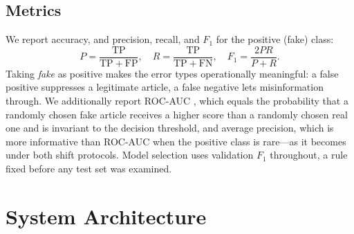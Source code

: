 \documentclass[conference]{IEEEtran}
\newcommand{\Fone}{$F_1$}
\begin{document}
\subsection{Metrics}
We report accuracy, and precision, recall, and \Fone{} for the positive
(fake) class:
\begin{equation}
  P=\frac{\mathrm{TP}}{\mathrm{TP}+\mathrm{FP}},\quad
  R=\frac{\mathrm{TP}}{\mathrm{TP}+\mathrm{FN}},\quad
  F_1=\frac{2PR}{P+R}.
  \label{eq:prf}
\end{equation}
Taking \emph{fake} as positive makes the error types operationally meaningful: a
false positive suppresses a legitimate article, a false negative lets
misinformation through. We additionally report ROC-AUC \cite{hanley1982meaning},
which equals the probability that a randomly chosen fake article receives a
higher score than a randomly chosen real one and is invariant to the decision
threshold, and average precision, which is more informative than ROC-AUC when
the positive class is rare---as it becomes under both shift protocols. Model
selection uses validation \Fone{} throughout, a rule fixed before any test set
was examined.

\section{System Architecture}
\label{sec:architecture}
\end{document}
